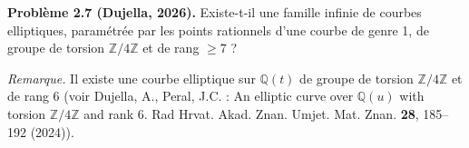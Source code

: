 \textbf{Problème 2.7 (Dujella, 2026).} Existe-t-il une famille infinie de courbes elliptiques, paramétrée par les points rationnels d'une courbe de genre 1, de groupe de torsion $\mathbb{Z}/4\mathbb{Z}$ et de rang $\geqslant 7$ ?

\medskip

\textit{Remarque.} Il existe une courbe elliptique sur $\mathbb{Q}(t)$ de groupe de torsion $\mathbb{Z}/4\mathbb{Z}$ et de rang 6 (voir Dujella, A., Peral, J.C. : An elliptic curve over $\mathbb{Q}(u)$ with torsion $\mathbb{Z}/4\mathbb{Z}$ and rank 6. Rad Hrvat. Akad. Znan. Umjet. Mat. Znan. \textbf{28}, 185--192 (2024)).
